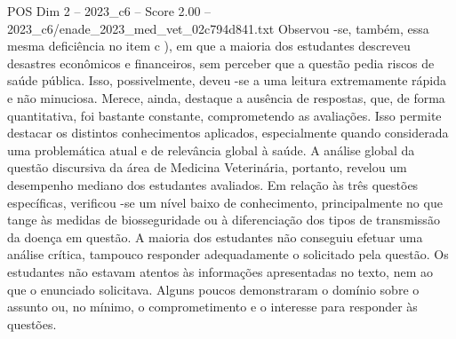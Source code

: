 \begin{textsample}{POS Dim 2 – 2023\_c6 – Score 2.00 – 2023\_c6/enade\_2023\_med\_vet\_02c794d841.txt}
Observou -se, também, essa mesma deficiência no item c ), em que a maioria dos estudantes descreveu desastres econômicos e financeiros, sem perceber que a questão pedia riscos de saúde pública.
Isso, possivelmente, deveu -se a uma leitura extremamente rápida e não minuciosa.
Merece, ainda, destaque a ausência de respostas, que, de forma quantitativa, foi bastante constante, comprometendo as avaliações.
Isso permite destacar os distintos conhecimentos aplicados, especialmente quando considerada uma problemática atual e de relevância global à saúde.
A análise global da questão discursiva da área de Medicina Veterinária, portanto, revelou um desempenho mediano dos estudantes avaliados.
Em relação às três questões específicas, verificou -se um nível baixo de conhecimento, principalmente no que tange às medidas de biosseguridade ou à diferenciação dos tipos de transmissão da doença em questão.
A maioria dos estudantes não conseguiu efetuar uma análise crítica, tampouco responder adequadamente o solicitado pela questão.
Os estudantes não estavam atentos às informações apresentadas no texto, nem ao que o enunciado solicitava.
Alguns poucos demonstraram o domínio sobre o assunto ou, no mínimo, o comprometimento e o interesse para responder às questões.

\end{textsample}
